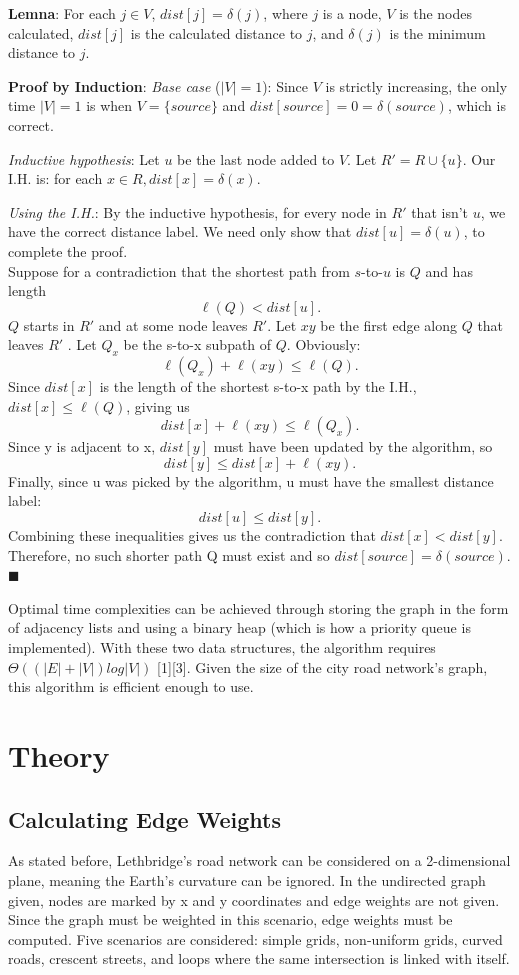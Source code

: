 \documentclass[letter,10pt]{article}
\begin{document}
\begin{adjustwidth}{1cm}{}
\textbf{Lemna}: For each $j \in V$, $dist[j] = \delta(j)$, where $j$ is a node, $V$ is the nodes calculated, $dist[j]$ is the calculated distance to $j$, and $\delta(j)$ is the minimum distance to $j$.

\noindent
\textbf{Proof by Induction}: \textit{Base case} ($|V| = 1$): Since $V$ is strictly increasing, the only time $|V| = 1$ is when
$V = \{ source \}$ and $dist[source] = 0 = \delta(source)$, which is correct.

\textit{Inductive hypothesis}: Let $u$ be the last node added to $V$. Let $R' = R \cup \{u\}$. Our I.H. is: for each $x \in R,dist[x] = \delta (x)$.

\textit{Using the I.H.}: By the inductive hypothesis, for every node in $R'$ that isn’t $u$, we have the correct distance label. We need only show that $dist[u] = \delta(u)$, to complete the proof.\\
\indent Suppose for a contradiction that the shortest path from $s$-to-$u$ is $Q$ and has length 
$$\ell (Q) < dist[u].$$
$Q$ starts in $R'$ and at some node leaves $R'$. Let $xy$ be the first edge along $Q$ that leaves $R'$ . Let $Q_x$ be the s-to-x subpath of $Q$. Obviously:
$$\ell (Q_x) +  \ell (xy) \leq \ell(Q).$$
Since $dist[x]$ is the length of the shortest s-to-x path by the I.H., $dist[x] \leq \ell(Q)$, giving us
$$dist[x] + \ell(xy) \leq \ell(Q_x).$$
Since y is adjacent to x, $dist[y]$ must have been updated by the algorithm, so
$$dist[y] \leq dist[x] + \ell(xy).$$
Finally, since u was picked by the algorithm, u must have the smallest distance label:
$$dist[u] \leq dist[y].$$
Combining these inequalities gives us the contradiction that $dist[x] < dist[y].$ Therefore, no such
shorter path Q must exist and so $dist[source] = \delta(source)$. $\blacksquare$

\end{adjustwidth}

Optimal time complexities can be achieved through storing the graph in the form of adjacency lists and using a binary heap (which is how a priority queue is implemented). With these two data structures, the algorithm requires $ \Theta ((|E|+|V|)log|V|)$ [1][3]. Given the size of the city road network's graph, this algorithm is efficient enough to use.
\newpage

\section{Theory}
\subsection*{Calculating Edge Weights}
As stated before, Lethbridge's road network can be considered on a 2-dimensional plane, meaning the Earth's curvature can be ignored. In the undirected graph given, nodes are marked by x and y coordinates and edge weights are not given. Since the graph must be weighted in this scenario, edge weights must be computed. Five scenarios are considered: simple grids, non-uniform grids, curved roads, crescent streets, and loops where the same intersection is linked with itself.
\end{document}
